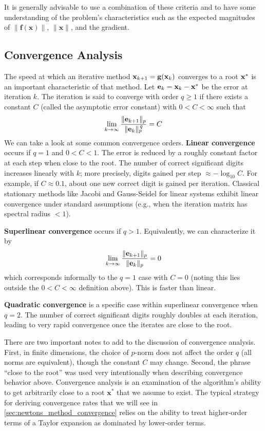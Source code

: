 It is generally advisable to use a combination of these criteria and to have some understanding of the problem's characteristics such as the expected magnitudes of $\| \mathbf f(\mathbf x) \|$, $\| \mathbf x \|$, and the gradient.

\subsection{Convergence Analysis}
The speed at which an iterative method $\mathbf{x}_{k+1} = \mathbf{g}(\mathbf{x}_k)$ converges to a root $\mathbf{x}^*$ is an important characteristic of that method. Let $\mathbf{e}_k = \mathbf{x}_k - \mathbf{x}^*$ be the error at iteration $k$. The iteration is said to converge with order $q \ge 1$ if there exists a constant $C$ (called the asymptotic error constant) with $0<C<\infty$ such that
\begin{equation}
    \lim_{k\to\infty} \frac{\|\mathbf{e}_{k+1}\|_p}{\|\mathbf{e}_k\|_p^{\,q}} = C
\end{equation}
We can take a look at some common convergence orders. \textbf{Linear convergence} occurs if $q=1$ and $0<C<1$. The error is reduced by a roughly constant factor at each step when close to the root. The number of correct significant digits increases linearly with $k$; more precisely, digits gained per step $\approx -\log_{10} C$. For example, if $C \approx 0.1$, about one new correct digit is gained per iteration. Classical stationary methods like Jacobi and Gauss-Seidel for linear systems exhibit linear convergence under standard assumptions (e.g., when the iteration matrix has spectral radius $<1$).

\textbf{Superlinear convergence} occurs if $q>1$. Equivalently, we can characterize it by
\begin{equation}
  \lim_{k\to\infty}\frac{\|\mathbf{e}_{k+1}\|_p}{\|\mathbf{e}_k\|_p}=0
\end{equation}
which corresponds informally to the $q=1$ case with $C=0$ (noting this lies outside the $0<C<\infty$ definition above). This is faster than linear.

\textbf{Quadratic convergence} is a specific case within superlinear convergence when $q=2$. The number of correct significant digits roughly doubles at each iteration, leading to very rapid convergence once the iterates are close to the root.

There are two important notes to add to the discussion of convergence analysis. First, in finite dimensions, the choice of $p$-norm does not affect the order $q$ (all norms are equivalent), though the constant $C$ may change. Second, the phrase ``close to the root'' was used very intentionally when describing convergence behavior above. Convergence analysis is an examination of the algorithm's ability to get arbitrarily close to a root $\mathbf x^*$ that we assume to exist. The typical strategy for deriving convergence rates that we will see in \autoref{sec:newtons_method_convergence} relies on the ability to treat higher-order terms of a Taylor expansion as dominated by lower-order terms. 



